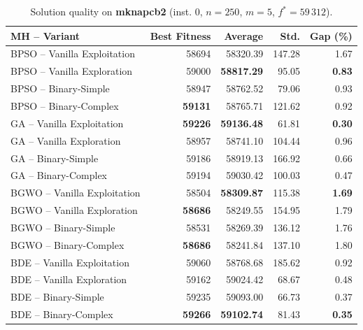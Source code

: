 \begin{table}[htbp]
  \centering
  \small
  \caption{Solution quality on \textbf{mknapcb2} (inst. 0, $n=250$, $m=5$, $f^*=59\,312$).}
  \label{tab:calidad_mknapcb2_0}
  \begin{tabular}{lrrrr}
    \toprule
    \textbf{MH -- Variant} &
    \textbf{Best Fitness} &
    \textbf{Average} &
    \textbf{Std.} &
    \textbf{Gap (\%)} \\
    \midrule
    BPSO -- Vanilla Exploitation &          58694 &         58320.39 & 147.28 &         1.67 \\
    BPSO -- Vanilla Exploration  &          59000 & \textbf{58817.29} &  95.05 & \textbf{0.83} \\
    BPSO -- Binary-Simple        &          58947 &         58762.52 &  79.06 &         0.93 \\
    BPSO -- Binary-Complex       & \textbf{59131} &         58765.71 & 121.62 &         0.92 \\
    \midrule
    GA -- Vanilla Exploitation   & \textbf{59226} & \textbf{59136.48} &  61.81 & \textbf{0.30} \\
    GA -- Vanilla Exploration    &          58957 &         58741.10 & 104.44 &         0.96 \\
    GA -- Binary-Simple          &          59186 &         58919.13 & 166.92 &         0.66 \\
    GA -- Binary-Complex         &          59194 &         59030.42 & 100.03 &         0.47 \\
    \midrule
    BGWO -- Vanilla Exploitation &          58504 & \textbf{58309.87} & 115.38 & \textbf{1.69} \\
    BGWO -- Vanilla Exploration  & \textbf{58686} &         58249.55 & 154.95 &         1.79 \\
    BGWO -- Binary-Simple        &          58531 &         58269.39 & 136.12 &         1.76 \\
    BGWO -- Binary-Complex       & \textbf{58686} &         58241.84 & 137.10 &         1.80 \\
    \midrule
    BDE -- Vanilla Exploitation  &          59060 &         58768.68 & 185.62 &         0.92 \\
    BDE -- Vanilla Exploration   &          59162 &         59024.42 &  68.67 &         0.48 \\
    BDE -- Binary-Simple         &          59235 &         59093.00 &  66.73 &         0.37 \\
    BDE -- Binary-Complex        & \textbf{59266} & \textbf{59102.74} &  81.43 & \textbf{0.35} \\
    \bottomrule
  \end{tabular}
\end{table}
